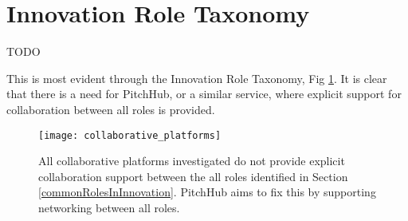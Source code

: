 \section{Innovation Role Taxonomy}

TODO

This is most evident through the Innovation Role Taxonomy, Fig \ref{fig:collaborative_platforms}. It is clear that there is a need for PitchHub, or a similar service, where explicit support for collaboration between all roles is provided.

\begin{figure}[ht]
    \centering
    \texttt{[image: collaborative\_platforms]}
    \caption{All collaborative platforms investigated do not provide explicit collaboration support between the all roles identified in Section \ref{commonRolesInInnovation}. PitchHub aims to fix this by supporting networking between all roles. }
    \label{fig:collaborative_platforms}
\end{figure}
